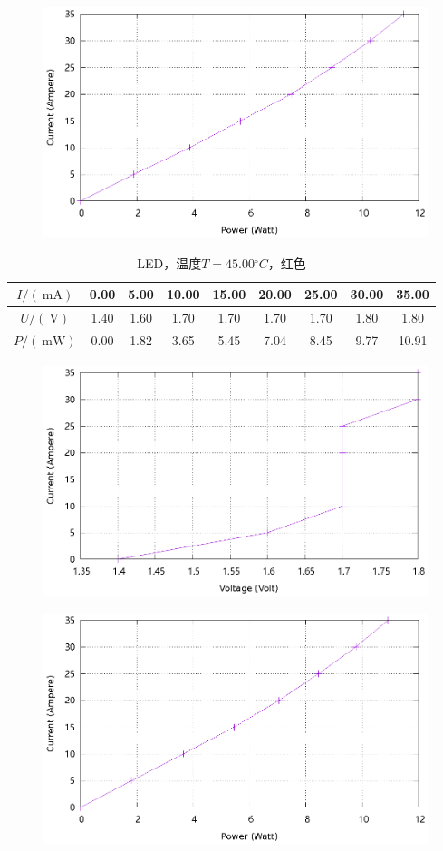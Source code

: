 \documentclass{ctexart}
\newcommand{\si}[1]{\  \mathrm{#1}}
\begin{document}
\begin{figure}[H]
    \centering
    \includegraphics[width=0.9\linewidth]{../output/led-pc-5.gnuplot}
\end{figure}
\newpage
\begin{table}[H]
    \centering
    \begin{tabular}{|c|c|c|c|c|c|c|c|c|}
        \hline
        $I/(\si{mA})$ & 0.00 & 5.00 & 10.00 & 15.00 & 20.00 & 25.00 & 30.00 & 35.00 \\\hline
        $U / (\si{V})$  & 1.40 & 1.60 & 1.70 & 1.70 & 1.70 & 1.70 & 1.80 & 1.80 \\\hline
        $P / (\si{mW})$ & 0.00 & 1.82 & 3.65 & 5.45 & 7.04 & 8.45 & 9.77 & 10.91 \\\hline
    \end{tabular}
    \caption{LED，温度$T=45.00{}^{\circ}C$，红色}
\end{table}
\begin{figure}[H]
    \centering
    \includegraphics[width=0.9\linewidth]{../output/led-vc-6.gnuplot}
\end{figure}
\begin{figure}[H]
    \centering
    \includegraphics[width=0.9\linewidth]{../output/led-pc-6.gnuplot}
\end{figure}
\end{document}
